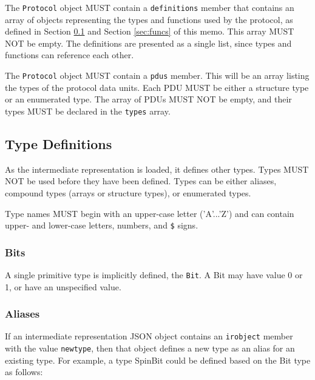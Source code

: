 \documentclass[10pt,twocolumn,a4paper]{article}
\begin{document}
The \texttt{Protocol} object MUST contain a \texttt{definitions} member
that contains an array of objects representing the types and functions
used by the protocol, as defined in Section \ref{sec:types} and Section
\ref{sec:funcs} of this memo. This array MUST NOT be empty. The definitions
are presented as a single list, since types and functions can reference
each other.

The \texttt{Protocol} object MUST contain a \texttt{pdus} member. This
will be an array listing the types of the protocol data units. Each PDU
MUST be either a structure type or an enumerated type. The array of PDUs
MUST NOT be empty, and their types MUST be declared in the \texttt{types}
array.

\subsection{Type Definitions}
\label{sec:types}

As the intermediate representation is loaded, it defines other types. Types
MUST NOT be used before they have been defined.
Types can be either aliases, compound types (arrays or structure types), or
enumerated types.

Type names MUST begin with an upper-case letter ('A'...'Z') and can contain
upper- and lower-case letters, numbers, and \verb|$| signs.

\subsubsection{Bits}

A single primitive type is implicitly defined, the \texttt{Bit}.
A Bit may have value 0 or 1, or have an unspecified value. 

\subsubsection{Aliases}

If an intermediate representation JSON object contains an \texttt{irobject}
member with the value \texttt{newtype}, then that object defines a new type
as an alias for an existing type. For example, a type SpinBit could be
defined based on the Bit type as follows:
\end{document}
